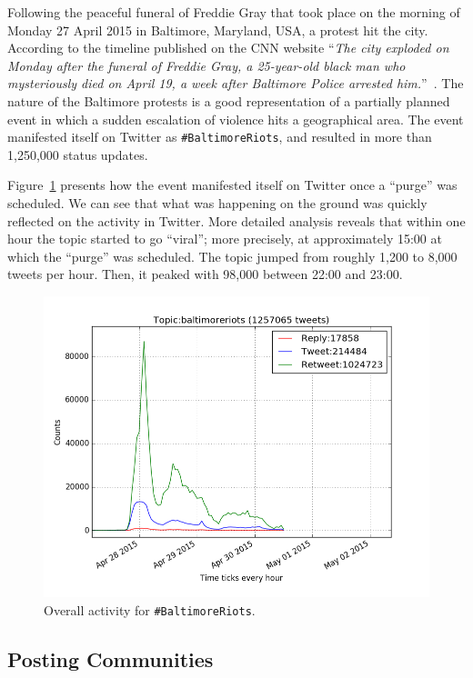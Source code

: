 Following the peaceful funeral of Freddie Gray that took place on the
morning of Monday 27 April 2015 in Baltimore, Maryland, USA, a protest
hit the city. According to the timeline published on the CNN website
``{\emph{The city exploded on Monday after the funeral of Freddie
Gray, a 25-year-old black man who mysteriously died on April 19, a
week after Baltimore Police arrested
him.}}''~\cite{baltimorewiki:2015}. The nature of the Baltimore protests
is a good representation of a partially planned event in which a sudden
escalation of violence hits a geographical area. The event manifested
itself on Twitter as {\texttt{\#BaltimoreRiots}}, and resulted in more
than 1,250,000 status updates.

Figure~\ref{fig:overallbaltimoreactivity} presents how the event manifested 
itself on Twitter once a ``purge'' was scheduled. We can see that what was 
happening on the ground was quickly reflected on the activity in Twitter. More detailed 
analysis reveals that within one hour the topic started to go ``viral''; more
precisely, at approximately 15:00 at which the ``purge'' was
scheduled. The topic jumped from roughly 1,200 to 8,000 tweets per
hour. Then, it peaked with 98,000 between 22:00 and 23:00.

\begin{figure}[htb]
\centering
\includegraphics[width=\columnwidth]{images/overallbaltimoreactivity.png}
\caption{Overall activity for {\texttt{\#BaltimoreRiots}}.}
\label{fig:overallbaltimoreactivity}
\end{figure}

\subsection{Posting Communities}\label{baltimoreposting}

